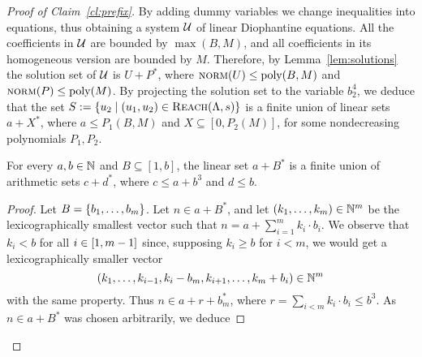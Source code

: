 \begin{appendixproof}
\begin{proof}[Proof of Claim~\ref{cl:prefix}]
By adding dummy variables we change inequalities into equations,
thus obtaining a system $\mathcal{U}$ of linear Diophantine equations.
All the coefficients in $\mathcal{U}$ are bounded by $\max(B, M)$, 
and all coefficients in its homogeneous version are bounded by $M$.
Therefore, by Lemma~\ref{lem:solutions} the solution set of $\mathcal{U}$ is $U+P^*$,
where $\textsc{norm}(U) \leq \textup{poly}(B,M)$ and $\textsc{norm}(P) \leq \textup{poly}(M)$.
By projecting the solution set to the variable $b^4_2$, we deduce that
the set $S:=\{u_2 \mid (u_1, u_2) \in \textsc{Reach}(\Lambda,s)\}$ is a finite union of 
linear sets $a+X^*$, where $a \leq P_1(B,M)$ and $X \subseteq [0,P_2(M)]$,
for some nondecreasing polynomials $P_1, P_2$.
%
%
%
\begin{claim}\label{cl:linear-1dim}
For every $a,b \in \mathbb{N}$ and $B \subseteq [1,b]$, the linear set $a+B^*$ is a finite union
of arithmetic sets $c + d^*$, where $c \leq a+b^3$ and $d \leq b$.
\end{claim}
\begin{proof}
Let $B = \{b_1, \ldots, b_m\}$.
Let $n \in a + B^*$, and let $(k_1, \ldots, k_m) \in \mathbb{N}^m$ be the lexicographically smallest vector such that
$n = a + \sum_{i=1}^m k_i \cdot b_i$.
We observe that $k_i < b$ for all $i\in[1, m-1]$ since,
supposing $k_i \geq b$ for
$i < m$, we would get a lexicographically smaller  vector
\[
(k_1, \ldots, k_{i-1}, k_i - b_m, k_{i+1}, \ldots, k_m+ b_i) \in \mathbb{N}^m
\]
with the same property. 
Thus $n \in a + r + b_m^*$,
where $r = \sum_{i<m} k_i \cdot b_i \leq b^3$. 
As $n\in a+ B^*$ was chosen arbitrarily, we deduce

\end{proof}
\end{proof}
\end{appendixproof}
